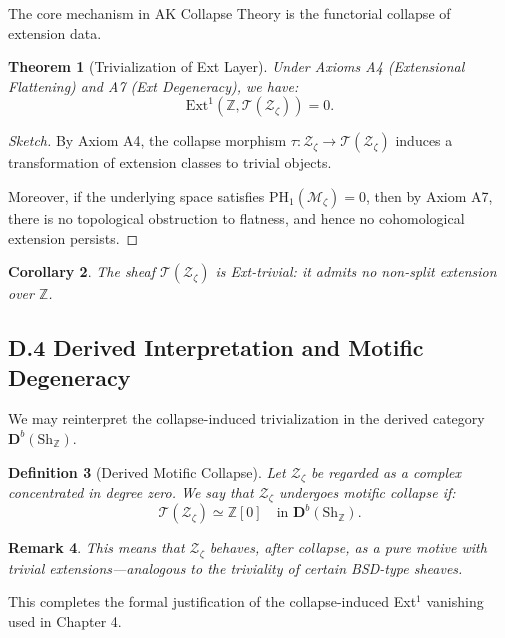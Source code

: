 \documentclass[11pt]{article}
\newtheorem{theorem}{Theorem}[section]
\newtheorem{definition}[theorem]{Definition}
\newtheorem{corollary}[theorem]{Corollary}
\newtheorem{remark}[theorem]{Remark}
\begin{document}
The core mechanism in AK Collapse Theory is the functorial collapse of extension data.

\begin{theorem}[Trivialization of Ext Layer]
Under Axioms A4 (Extensional Flattening) and A7 (Ext Degeneracy), we have:
\[
\mathrm{Ext}^1(\mathbb{Z}, \mathcal{T}(\mathcal{Z}_\zeta)) = 0.
\]
\end{theorem}

\begin{proof}[Sketch]
By Axiom A4, the collapse morphism $\tau: \mathcal{Z}_\zeta \to \mathcal{T}(\mathcal{Z}_\zeta)$  
induces a transformation of extension classes to trivial objects.

Moreover, if the underlying space satisfies $\mathrm{PH}_1(\mathcal{M}_\zeta) = 0$, then by Axiom A7,  
there is no topological obstruction to flatness, and hence no cohomological extension persists.
\end{proof}

\begin{corollary}
The sheaf $\mathcal{T}(\mathcal{Z}_\zeta)$ is Ext-trivial: it admits no non-split extension over $\mathbb{Z}$.  
\end{corollary}

\subsection*{D.4 Derived Interpretation and Motific Degeneracy}

We may reinterpret the collapse-induced trivialization in the derived category $\mathbf{D}^b(\text{Sh}_\mathbb{Z})$.

\begin{definition}[Derived Motific Collapse]
Let $\mathcal{Z}_\zeta$ be regarded as a complex concentrated in degree zero.  
We say that $\mathcal{Z}_\zeta$ undergoes motific collapse if:
\[
\mathcal{T}(\mathcal{Z}_\zeta) \simeq \mathbb{Z}[0] \quad \text{in } \mathbf{D}^b(\text{Sh}_\mathbb{Z}).
\]
\end{definition}

\begin{remark}
This means that $\mathcal{Z}_\zeta$ behaves, after collapse, as a pure motive with trivial extensions—analogous to the triviality of certain BSD-type sheaves.
\end{remark}

This completes the formal justification of the collapse-induced Ext$^1$ vanishing used in Chapter 4.
\end{document}
